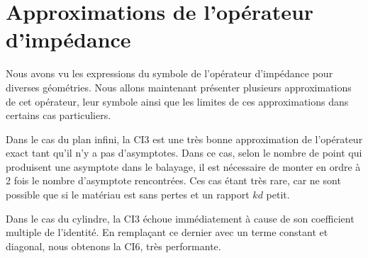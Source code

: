 \chapter{Approximations de l'opérateur d'impédance}
\label{sec:chap2}
\minitoc
\newpage
{}
Nous avons vu les expressions du symbole de l'opérateur d'impédance pour diverses géométries. Nous allons maintenant présenter plusieurs approximations de cet opérateur, leur symbole ainsi que les limites de ces approximations dans certains cas particuliers.


%
Dans le cas du plan infini, la CI3 est une très bonne approximation de l'opérateur exact tant qu'il n'y a pas d'asymptotes. Dans ce cas, selon le nombre de point qui produisent une asymptote dans le balayage, il est nécessaire de monter en ordre à 2 fois le nombre d'asymptote rencontrées. Ces cas étant très rare, car ne sont possible que si le matériau est sans pertes et un rapport \(kd\) petit.

Dans le cas du cylindre, la CI3 échoue immédiatement à cause de son coefficient multiple de l'identité. En remplaçant ce dernier avec un terme constant et diagonal, nous obtenons la CI6, très performante. 